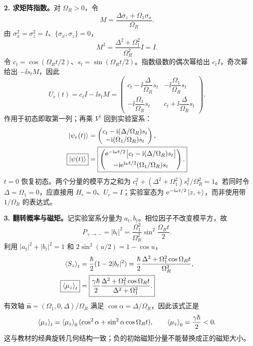 \begin{checkedsolution}
\textbf{2. 求矩阵指数。}对 $\Omega_R>0$，令
\begin{equation}
  M=\frac{\Delta\sigma_z+\Omega_1\sigma_x}{\Omega_R}.
\end{equation}
由 $\sigma_x^2=\sigma_z^2=I$、$\{\sigma_x,\sigma_z\}=0$，
\begin{equation}
  M^2=\frac{\Delta^2+\Omega_1^2}{\Omega_R^2}I=I.
\end{equation}
令 $c_t=\cos(\Omega_Rt/2)$、$s_t=\sin(\Omega_Rt/2)$。指数级数的偶次幂给出 $c_tI$，奇次幂给出 $-\ii s_tM$，因此
\begin{equation}
  \boxed{U_r(t)=c_tI-\ii s_tM
   =\begin{pmatrix}
     c_t-\ii\dfrac\Delta{\Omega_R}s_t&-\ii\dfrac{\Omega_1}{\Omega_R}s_t\\[4pt]
     -\ii\dfrac{\Omega_1}{\Omega_R}s_t&c_t+\ii\dfrac\Delta{\Omega_R}s_t
   \end{pmatrix}.}
\end{equation}
作用于初态即取第一列；再乘 $V^\dagger$ 回到实验室系：
\begin{align}
  \left|\psi_r(t)\right\rangle&=\begin{pmatrix}
    c_t-\mathrm{i}(\Delta/\Omega_R)s_t\\-\mathrm{i}(\Omega_1/\Omega_R)s_t
    \end{pmatrix},\\
  \boxed{\left|\psi(t)\right\rangle}&=
   \boxed{\begin{pmatrix}
     \mathrm{e}^{-\mathrm{i}\omega t/2}\bigl[c_t-\mathrm{i}(\Delta/\Omega_R)s_t\bigr]\\[4pt]
     -\mathrm{i}\mathrm{e}^{\mathrm{i}\omega t/2}(\Omega_1/\Omega_R)s_t
   \end{pmatrix}.}
\end{align}
$t=0$ 恢复初态。两个分量的模平方之和为
$c_t^2+(\Delta^2+\Omega_1^2)s_t^2/\Omega_R^2=1$。若同时令 $\Delta=\Omega_1=0$，应直接用 $H_r=0$、$U_r=I$；实验室态为 $\mathrm{e}^{-\mathrm{i}\omega t/2}\left|z,+\right\rangle$，而非使用带 $1/\Omega_R$ 的表达式。

\textbf{3. 翻转概率与磁矩。}记实验室系分量为 $a_t,b_t$。相位因子不改变模平方，故
\begin{equation}
  \boxed{P_{+\to-}=|b_t|^2
    =\frac{\Omega_1^2}{\Omega_R^2}\sin^2\frac{\Omega_Rt}{2}.}
\end{equation}
利用 $|a_t|^2+|b_t|^2=1$ 和 $2\sin^2(u/2)=1-\cos u$，
\begin{align}
  \left\langle S_z \right\rangle_t
    &=\frac\hbar2(1-2|b_t|^2)
      =\frac\hbar2\frac{\Delta^2+\Omega_1^2\cos\Omega_Rt}{\Omega_R^2},\\
  \boxed{\left\langle \mu_z \right\rangle_t}
    &=\boxed{\frac{\gamma\hbar}{2}
       \frac{\Delta^2+\Omega_1^2\cos\Omega_Rt}{\Delta^2+\Omega_1^2}.}
\end{align}
有效轴 $\hat{\mathbf n}=(\Omega_1,0,\Delta)/\Omega_R$ 满足 $\cos\alpha=\Delta/\Omega_R$，因此该式正是
\begin{equation}
  \left\langle \mu_z \right\rangle_t=\left\langle \mu_z \right\rangle_0
    (\cos^2\alpha+\sin^2\alpha\cos\Omega_Rt),\qquad
  \left\langle \mu_z \right\rangle_0=\frac{\gamma\hbar}{2}<0.
\end{equation}
这与教材的经典旋转几何结构一致；负的初始磁矩分量不能替换成正的磁矩大小。


\end{checkedsolution}

